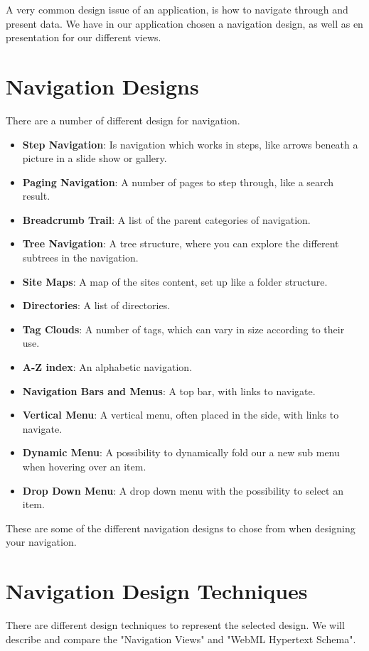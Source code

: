 A very common design issue of an application, is how to navigate through and present data.  We have in our application chosen a navigation design, as well as en presentation for our different views.

\section{Navigation Designs}
There are a number of different design for navigation.

\begin{itemize}
\item \textbf{Step Navigation}: Is navigation which works in steps, like arrows beneath a picture in a slide show or gallery.
\item \textbf{Paging Navigation}: A number of pages to step through, like a search result.
\item \textbf{Breadcrumb Trail}: A list of the parent categories of navigation.
\item \textbf{Tree Navigation}: A tree structure, where you can explore the different subtrees in the navigation.
\item \textbf{Site Maps}: A map of the sites content, set up like a folder structure.
\item \textbf{Directories}: A list of directories.
\item \textbf{Tag Clouds}: A number of tags, which can vary in size according to their use.
\item \textbf{A-Z index}: An alphabetic navigation.
\item \textbf{Navigation Bars and Menus}: A top bar, with links to navigate.
\item \textbf{Vertical Menu}: A vertical menu, often placed in the side, with links to navigate.
\item \textbf{Dynamic Menu}: A possibility to dynamically fold our a new sub menu when hovering over an item.
\item \textbf{Drop Down Menu}: A drop down menu with the possibility to select an item.
\end{itemize}

These are some of the different navigation designs to chose from when designing your navigation.

\section{Navigation Design Techniques}
There are different design techniques to represent the selected design. We will describe and compare the "Navigation Views" and "WebML Hypertext Schema".

